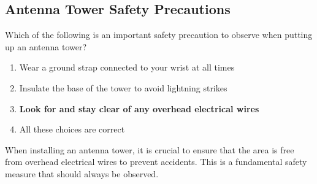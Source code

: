 \subsection{Antenna Tower Safety Precautions}
\label{T0B04}

\begin{tcolorbox}[colback=gray!10!white,colframe=black!75!black,title=T0B04]
Which of the following is an important safety precaution to observe when putting up an antenna tower?
\begin{enumerate}[noitemsep]
    \item Wear a ground strap connected to your wrist at all times
    \item Insulate the base of the tower to avoid lightning strikes
    \item \textbf{Look for and stay clear of any overhead electrical wires}
    \item All these choices are correct
\end{enumerate}
\end{tcolorbox}

When installing an antenna tower, it is crucial to ensure that the area is free from overhead electrical wires to prevent accidents. This is a fundamental safety measure that should always be observed.